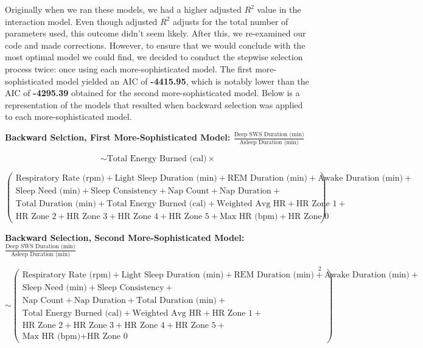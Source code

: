 \documentclass{article}
\begin{document}
Originally when we ran these models, we had a higher adjusted $R^2$ value in the interaction model. Even though adjusted $R^2$ adjusts for the total number of parameters used, this outcome didn't seem likely. After this, we re-examined our code and made corrections. However, to ensure that we would conclude with the most optimal model we could find, we decided to conduct the stepwise selection process twice: once using each more-sophisticated model. The first more-sophisticated model yielded an AIC of \textbf{-4415.95}, which is notably lower than the AIC of \textbf{-4295.39} obtained for the second more-sophisticated model. Below is a representation of the models that resulted when backward selection was applied to each more-sophisticated model.

\newpage

\textbf{Backward Selction, First More-Sophisticated Model: $\frac{\text{Deep SWS Duration (min)}}{\text{Asleep Duration (min)}}$}

\[
\sim \text{Total Energy Burned (cal)} \times
\]

\begin{equation}
\left(
\begin{split}
\text{Respiratory Rate (rpm)} + \text{Light Sleep Duration (min)} + \text{REM Duration (min)} + \text{Awake Duration (min)} + \\
\text{Sleep Need (min)} + \text{Sleep Consistency} + \text{Nap Count} + \text{Nap Duration} + \\
\text{Total Duration (min)} + \text{Total Energy Burned (cal)} + \text{Weighted Avg HR} + \text{HR Zone 1} + \\
\text{HR Zone 2} + \text{HR Zone 3} + \text{HR Zone 4} + \text{HR Zone 5} + \text{Max HR (bpm)} + \text{HR Zone 0}
\end{split}
\right)
\end{equation}


\bigskip

\textbf{Backward Selection, Second More-Sophisticated Model: $\frac{\text{Deep SWS Duration (min)}}{\text{Asleep Duration (min)}}$}

\begin{equation}
\sim 
\left(
\begin{split}
\text{Respiratory Rate (rpm)} + \text{Light Sleep Duration (min)} + \text{REM Duration (min)} + \text{Awake Duration (min)} + \\
\text{Sleep Need (min)} + \text{Sleep Consistency} + \\
\text{Nap Count} + \text{Nap Duration} + \text{Total Duration (min)} + \\
\text{Total Energy Burned (cal)} + \text{Weighted Avg HR} + \text{HR Zone 1} + \\
\text{HR Zone 2} + \text{HR Zone 3} + \text{HR Zone 4} + \text{HR Zone 5} + \\
\text{Max HR (bpm)} + \text{HR Zone 0}
\end{split}
\right)^2
\end{equation}
\end{document}
